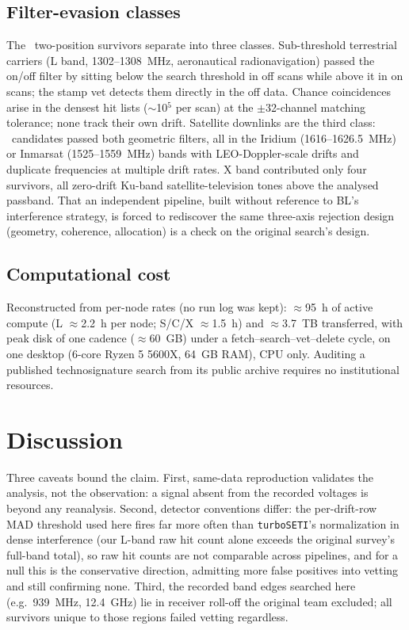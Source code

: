 \documentclass[twocolumn]{aastex631}
\newcommand{\code}[1]{\texttt{#1}}
\begin{document}
\subsection{Filter-evasion classes}
The \aiTotSurvivors\ two-position survivors separate into three classes.
Sub-threshold terrestrial carriers (L band, 1302--1308~MHz, aeronautical radionavigation)
passed the on/off filter by sitting below the search threshold in off scans while above
it in on scans; the stamp vet detects them directly in the off data. Chance coincidences
arise in the densest hit lists ($\sim$10$^{5}$ per scan) at the $\pm$32-channel matching
tolerance; none track their own drift. Satellite downlinks are the third
class: \aiSatCoherent\ candidates passed both geometric filters, all in the
Iridium (1616--1626.5~MHz) or Inmarsat (1525--1559~MHz) bands with LEO-Doppler-scale
drifts and duplicate frequencies at multiple drift rates. X band contributed only four
survivors, all zero-drift Ku-band satellite-television tones above the analysed
passband. That an independent pipeline, built without reference to BL's interference
strategy, is forced to rediscover the same three-axis rejection design (geometry,
coherence, allocation) is a check on the original search's design.

\subsection{Computational cost}
Reconstructed from per-node rates (no run log was kept): $\approx$95~h of active compute (L $\approx$2.2~h per node;
S/C/X $\approx$1.5~h) and $\approx$3.7~TB transferred, with peak disk of one cadence
($\approx$60~GB) under a fetch--search--vet--delete cycle, on one desktop (6-core Ryzen
5 5600X, 64~GB RAM), CPU only. Auditing a published technosignature search from its
public archive requires no institutional resources.

\section{Discussion}
Three caveats bound the claim. First, same-data reproduction validates the analysis, not the
observation: a signal absent from the recorded voltages is beyond any reanalysis.
Second, detector conventions differ: the per-drift-row MAD threshold used here fires far
more often than \code{turboSETI}'s normalization in dense interference (our L-band raw
hit count alone exceeds the original survey's full-band total), so raw hit counts are
not comparable across pipelines, and for a null this is the conservative direction,
admitting more false positives into vetting and still confirming none. Third, the
recorded band edges searched here (e.g.\ 939~MHz, 12.4~GHz) lie in receiver roll-off
the original team excluded; all survivors unique to those regions failed vetting
regardless.
\end{document}
